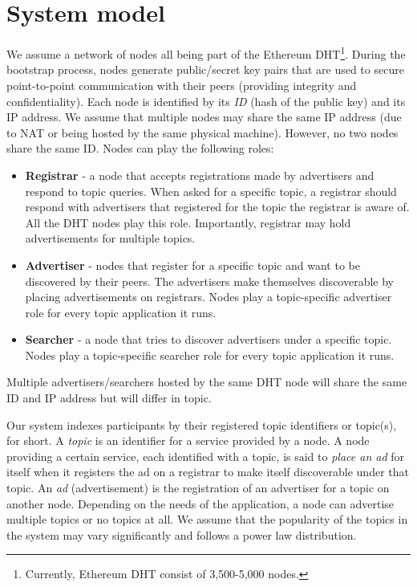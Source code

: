 
\section{System model}
We assume a network of nodes all being part of the Ethereum DHT\footnote{Currently, Ethereum DHT consist of 3,500-5,000 nodes.}. During the bootstrap process, nodes generate public/secret key pairs that are used to secure point-to-point communication with their peers (providing integrity and confidentiality). Each node is identified by its \emph{ID} (hash of the public key) and its IP address. We assume that multiple nodes may share the same IP address (due to NAT or being hosted by the same physical machine). However, no two nodes share the same ID. Nodes can play the following roles:
\begin{itemize}
    \item \textbf{Registrar} - a node that accepts registrations made by advertisers and respond to topic queries. When asked for a specific topic, a registrar should respond with advertisers that registered for the topic the registrar is aware of. All the DHT nodes play this role. Importantly, registrar may hold advertisements for multiple topics. 
    \item \textbf{Advertiser} - nodes that register for a specific topic and want to be discovered by their peers. The advertisers make themselves discoverable by placing advertisements on registrars. Nodes play a topic-specific advertiser role for every topic application it runs.
    \item \textbf{Searcher} - a node that tries to discover advertisers under a specific topic. Nodes play a topic-specific searcher role for every topic application it runs.
\end{itemize}
Multiple advertisers/searchers hosted by the same DHT node will share the same ID and IP address but will differ in topic. 

Our system indexes participants by their registered topic identifiers or topic(s), for short. A \emph{topic} is an identifier for a service provided by a node. A node providing a certain service, each identified with a topic, is said to \emph{place an ad} for itself when it registers the ad on a registrar to make itself discoverable under that topic. An \emph{ad} (\ie advertisement) is the registration of an advertiser for a topic on another node. Depending on the needs of the application, a node can advertise multiple topics or no topics at all. We assume that the popularity of the topics in the system may vary significantly and follows a power law distribution. 

